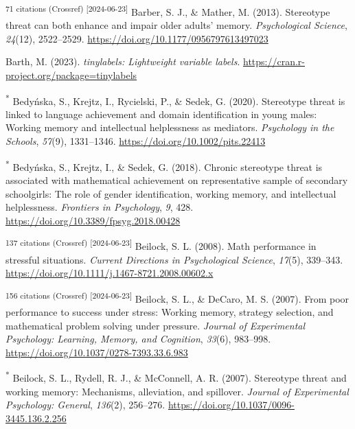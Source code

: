 \documentclass[
  stu, a4paper,floatsintext]{apa7}
\newlength{\cslhangindent}
\newenvironment{CSLReferences}[2] %
 {\begin{list}{}{%
  \setlength{\itemindent}{0pt}
  \setlength{\leftmargin}{0pt}
  \setlength{\parsep}{0pt}
  \ifodd #1
   \setlength{\leftmargin}{\cslhangindent}
   \setlength{\itemindent}{-1\cslhangindent}
  \fi
  \setlength{\itemsep}{#2\baselineskip}}}
 {\end{list}}
\begin{document}
\begin{CSLReferences}{1}{0}
\textsuperscript{71 citations (Crossref) {[}2024-06-23{]}} Barber, S. J., \& Mather, M. (2013). Stereotype threat can both enhance and impair older adults' memory. \emph{Psychological Science}, \emph{24}(12), 2522--2529. \url{https://doi.org/10.1177/0956797613497023}

Barth, M. (2023). \emph{{tinylabels}: Lightweight variable labels}. \url{https://cran.r-project.org/package=tinylabels}

\textsuperscript{*} Bedyńska, S., Krejtz, I., Rycielski, P., \& Sedek, G. (2020). Stereotype threat is linked to language achievement and domain identification in young males: {Working} memory and intellectual helplessness as mediators. \emph{Psychology in the Schools}, \emph{57}(9), 1331--1346. \url{https://doi.org/10.1002/pits.22413}

\textsuperscript{*} Bedyńska, S., Krejtz, I., \& Sedek, G. (2018). Chronic stereotype threat is associated with mathematical achievement on representative sample of secondary schoolgirls: {The} role of gender identification, working memory, and intellectual helplessness. \emph{Frontiers in Psychology}, \emph{9}, 428. \url{https://doi.org/10.3389/fpsyg.2018.00428}

\textsuperscript{137 citations (Crossref) {[}2024-06-23{]}} Beilock, S. L. (2008). Math performance in stressful situations. \emph{Current Directions in Psychological Science}, \emph{17}(5), 339--343. \url{https://doi.org/10.1111/j.1467-8721.2008.00602.x}

\textsuperscript{156 citations (Crossref) {[}2024-06-23{]}} Beilock, S. L., \& DeCaro, M. S. (2007). From poor performance to success under stress: {Working} memory, strategy selection, and mathematical problem solving under pressure. \emph{Journal of Experimental Psychology: Learning, Memory, and Cognition}, \emph{33}(6), 983--998. \url{https://doi.org/10.1037/0278-7393.33.6.983}

\textsuperscript{*} Beilock, S. L., Rydell, R. J., \& McConnell, A. R. (2007). Stereotype threat and working memory: {Mechanisms}, alleviation, and spillover. \emph{Journal of Experimental Psychology: General}, \emph{136}(2), 256--276. \url{https://doi.org/10.1037/0096-3445.136.2.256}


\end{CSLReferences}
\end{document}

